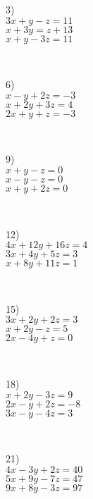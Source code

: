 \begin{multicols}{3}
  3)\\
  $3 x + y - z = 11$\\
  $x + 3 y = z + 13$\\
  $x + y - 3 z = 11$\par
~\par
  6)\\
  $x - y + 2 z = - 3$\\
  $x + 2 y + 3 z = 4$\\
  $2 x + y + z = - 3$\par
~\par
  9)\\
  $x + y - z = 0$\\
  $x - y - z = 0$\\
  $x + y + 2 z = 0$\par
~\par
  12)\\
  $4 x + 12 y + 16 z = 4$\\
  $3 x + 4 y + 5 z = 3$\\
  $x + 8 y + 11 z = 1$\par
~\par
  15)\\
  $3 x + 2 y + 2 z = 3$\\
  $x + 2 y - z = 5$\\
  $2 x - 4 y + z = 0$\par
~\par
  18)\\
  $x + 2 y - 3 z = 9$\\
  $2 x - y + 2 z = - 8$\\
  $3 x - y - 4 z = 3$\par
~\par
  21)\\
  $4 x - 3 y + 2 z = 40$\\
  $5 x + 9 y - 7 z = 47$\\
  $9 x + 8 y - 3 z = 97$\par
~\par

\end{multicols}

